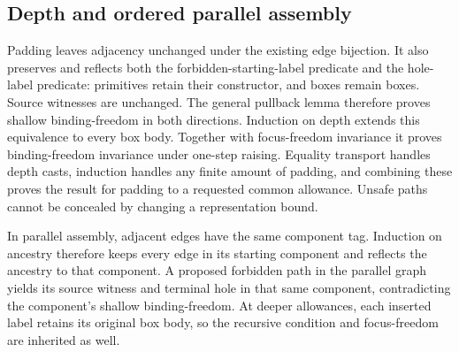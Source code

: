 





\subsection{Depth and ordered parallel assembly}


Padding leaves adjacency unchanged under the existing edge bijection.
It also preserves and reflects both the forbidden-starting-label predicate
and the hole-label predicate: primitives retain their constructor, and
boxes remain boxes. Source witnesses are unchanged. The general pullback
lemma therefore proves shallow binding-freedom in both directions.
Induction on depth extends this equivalence to every box body. Together
with focus-freedom invariance it proves binding-freedom invariance under
one-step raising. Equality transport handles depth casts, induction handles
any finite amount of padding, and combining these proves the result for
padding to a requested common allowance. Unsafe paths cannot be concealed
by changing a representation bound.



















In parallel assembly, adjacent edges have the same component tag. Induction
on ancestry therefore keeps every edge in its starting component and
reflects the ancestry to that component. A proposed forbidden path in the
parallel graph yields its source witness and terminal hole in that same
component, contradicting the component's shallow binding-freedom.
At deeper allowances, each inserted label retains its original box body,
so the recursive condition and focus-freedom are inherited as well.

